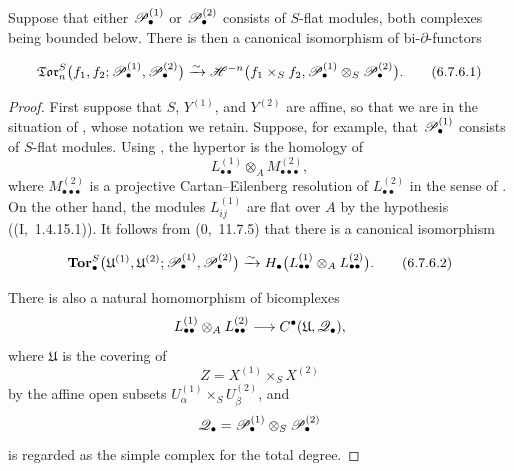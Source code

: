 \begin{proposition}[6.7.6]
\label{III.6.7.6}
Suppose that either $\mathscr{P}_\bullet^{(1)}$ or
$\mathscr{P}_\bullet^{(2)}$ consists of $S$-flat modules, both
complexes being bounded below.  There is then a canonical
isomorphism of bi-$\partial$-functors
\begin{env}[6.7.6.1]
\label{III.6.7.6.1}
\[
  \mathfrak{Tor}_n^S
  \bigl(
    f_1,f_2;
    \mathscr{P}_\bullet^{(1)},\mathscr{P}_\bullet^{(2)}
  \bigr)
  \xrightarrow{\sim}
  \mathscr{H}^{-n}
  \bigl(
    f_1\times_Sf_2,
    \mathscr{P}_\bullet^{(1)}
    \otimes_S\mathscr{P}_\bullet^{(2)}
  \bigr).
  \tag{6.7.6.1}\label{III.6.7.6.1.eq}
\]
\end{env}
\end{proposition}

\begin{proof}
First suppose that $S$, $Y^{(1)}$, and $Y^{(2)}$ are affine, so
that we are in the situation of , whose notation
we retain.  Suppose, for example, that
$\mathscr{P}_\bullet^{(1)}$ consists of $S$-flat modules.  Using
, the hypertor is the homology of
\[
  L_{\bullet\bullet}^{(1)}
  \otimes_A M_{\bullet\bullet\bullet}^{(2)},
\]
where $M_{\bullet\bullet\bullet}^{(2)}$ is a projective
Cartan--Eilenberg resolution of $L_{\bullet\bullet}^{(2)}$ in
the sense of .  On the other hand, the modules
$L_{ij}^{(1)}$ are flat over $A$ by the hypothesis
((I,~1.4.15.1)).  It follows from
(0,~11.7.5) that there is a canonical isomorphism
\begin{env}[6.7.6.2]
\label{III.6.7.6.2}
\[
  \mathbf{Tor}_\bullet^S
  \bigl(
    \mathfrak U^{(1)},\mathfrak U^{(2)};
    \mathscr{P}_\bullet^{(1)},\mathscr{P}_\bullet^{(2)}
  \bigr)
  \xrightarrow{\sim}
  H_\bullet
  \bigl(
    L_{\bullet\bullet}^{(1)}
    \otimes_A L_{\bullet\bullet}^{(2)}
  \bigr).
  \tag{6.7.6.2}\label{III.6.7.6.2.eq}
\]
\end{env}

There is also a natural homomorphism of bicomplexes
\[
  L_{\bullet\bullet}^{(1)}
  \otimes_A L_{\bullet\bullet}^{(2)}
  \longrightarrow
  C^\bullet(\mathfrak U,\mathscr{Q}_\bullet),
\]
where $\mathfrak U$ is the covering of
\[
  Z=X^{(1)}\times_SX^{(2)}
\]
by the affine open subsets
$U_\alpha^{(1)}\times_SU_\beta^{(2)}$, and
\[
  \mathscr{Q}_\bullet
  =
  \mathscr{P}_\bullet^{(1)}
  \otimes_S\mathscr{P}_\bullet^{(2)}
\]
is regarded as the simple complex for the total degree.



\end{proof}
